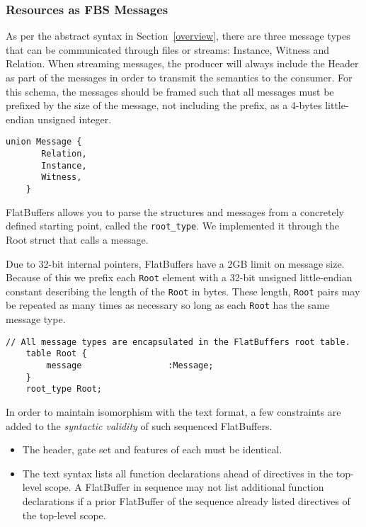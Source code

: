 \subsubsection*{Resources as FBS Messages}

As per the abstract syntax in Section~\ref{overview}, there are three message
types that can be communicated through files or streams: \textsf{Instance},
\textsf{Witness} and \textsf{Relation}. When streaming messages, the producer will always include the \textsf{Header} as part of the messages in order to transmit the semantics to the consumer. For this schema, the messages should be framed such that all messages must be prefixed by the size of the message, not including the prefix, as a 4-bytes little-endian unsigned integer.

\begin{lstlisting}[style=fbslisting]
    union Message {
       Relation,
       Instance,
       Witness,
    }
\end{lstlisting}

FlatBuffers allows you to parse the structures and messages from a concretely defined starting point, called the \texttt{root\_type}. We implemented it through the \textsf{Root} struct that calls a message.

Due to 32-bit internal pointers, FlatBuffers have a 2GB limit on message size.
Because of this we prefix each \texttt{Root} element with a 32-bit unsigned little-endian constant describing the length of the \texttt{Root} in bytes.
These length, \texttt{Root} pairs may be repeated as many times as necessary so long as each \texttt{Root} has the same message type.

\begin{lstlisting}[style=fbslisting]
    // All message types are encapsulated in the FlatBuffers root table.
    table Root {
        message                 :Message;
    }
    root_type Root;
\end{lstlisting}

In order to maintain isomorphism with the text format, a few constraints are added to the \textit{syntactic validity} of such sequenced FlatBuffers.\\

\begin{itemize}
    \item The header, gate set and features of each must be identical.
    \item The text syntax lists all function declarations ahead of directives in the top-level scope.
    A FlatBuffer in sequence may not list additional function declarations if a prior FlatBuffer of the sequence already listed directives of the top-level scope.
\end{itemize}


